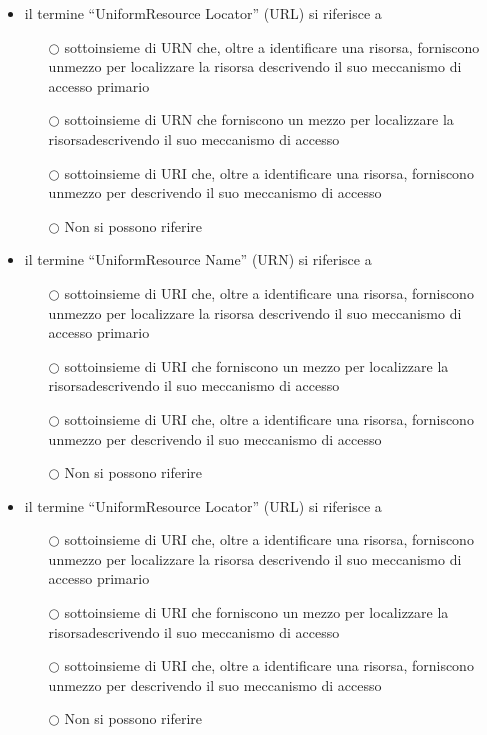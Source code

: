 \documentclass[10pt,twocolumn]{article}
\begin{document}
\begin{itemize}
    \item il termine “UniformResource Locator” (URL) si riferisce a
          \begin{itemize}
              \item[$\bigcirc$] sottoinsieme di URN che, oltre a identificare una risorsa, forniscono unmezzo per localizzare la risorsa descrivendo il suo meccanismo di accesso primario
              \item[$\bigcirc$] sottoinsieme di URN che forniscono un mezzo per localizzare la risorsadescrivendo il suo meccanismo di accesso
              \item[$\bigcirc$] sottoinsieme di URI che, oltre a identificare una risorsa, forniscono unmezzo per descrivendo il suo meccanismo di accesso
              \item[$\bigcirc$] Non si possono riferire
          \end{itemize}
\end{itemize}
\begin{itemize}
    \item il termine “UniformResource Name” (URN) si riferisce a
          \begin{itemize}
              \item[$\bigcirc$] sottoinsieme di URI che, oltre a identificare una risorsa, forniscono unmezzo per localizzare la risorsa descrivendo il suo meccanismo di accesso primario
              \item[$\bigcirc$] sottoinsieme di URI che forniscono un mezzo per localizzare la risorsadescrivendo il suo meccanismo di accesso
              \item[$\bigcirc$] sottoinsieme di URI che, oltre a identificare una risorsa, forniscono unmezzo per descrivendo il suo meccanismo di accesso
              \item[$\bigcirc$] Non si possono riferire
          \end{itemize}
\end{itemize}
\begin{itemize}
    \item il termine “UniformResource Locator” (URL) si riferisce a
          \begin{itemize}
              \item[$\bigcirc$] sottoinsieme di URI che, oltre a identificare una risorsa, forniscono unmezzo per localizzare la risorsa descrivendo il suo meccanismo di accesso primario
              \item[$\bigcirc$] sottoinsieme di URI che forniscono un mezzo per localizzare la risorsadescrivendo il suo meccanismo di accesso
              \item[$\bigcirc$] sottoinsieme di URI che, oltre a identificare una risorsa, forniscono unmezzo per descrivendo il suo meccanismo di accesso
              \item[$\bigcirc$] Non si possono riferire
          \end{itemize}
\end{itemize}
\end{document}
